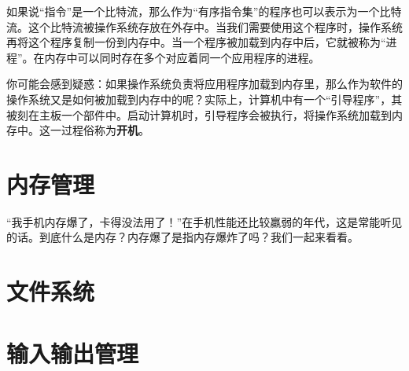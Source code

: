 如果说“指令”是一个比特流，那么作为“有序指令集”的程序也可以表示为一个比特流。这个比特流被操作系统存放在外存中。当我们需要使用这个程序时，操作系统再将这个程序复制一份到内存中。当一个程序被加载到内存中后，它就被称为“进程”。在内存中可以同时存在多个对应着同一个应用程序的进程。

你可能会感到疑惑：如果操作系统负责将应用程序加载到内存里，那么作为软件的操作系统又是如何被加载到内存中的呢？实际上，计算机中有一个“引导程序”，其被刻在主板一个部件中。启动计算机时，引导程序会被执行，将操作系统加载到内存中。这一过程俗称为\textbf{开机}。

\section{内存管理}\label{sec:os_memory_management}

“我手机内存爆了，卡得没法用了！”在手机性能还比较羸弱的年代，这是常能听见的话。到底什么是内存？内存爆了是指内存爆炸了吗？我们一起来看看。



\section{文件系统}\label{sec:os:file_system}


\section{输入输出管理}\label{sec:os:io_management}
